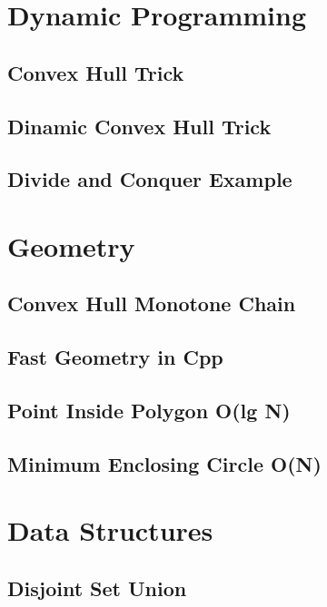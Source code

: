 \section{Dynamic Programming}
\subsection{Convex Hull Trick}
\raggedbottom
\hrulefill
\subsection{Dinamic Convex Hull Trick}
\raggedbottom
\hrulefill
\subsection{Divide and Conquer Example}
\raggedbottom
\hrulefill

\section{Geometry}
\subsection{Convex Hull Monotone Chain}
\raggedbottom
\hrulefill
\subsection{Fast Geometry in Cpp}
\raggedbottom
\hrulefill
\subsection{Point Inside Polygon O(lg N)}
\raggedbottom
\hrulefill
\subsection{Minimum Enclosing Circle O(N)}
\raggedbottom
\hrulefill

\section{Data Structures}
\subsection{Disjoint Set Union}
\raggedbottom
\hrulefill
